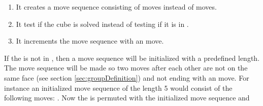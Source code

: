 \begin{enumerate}
	\item It creates a move sequence consisting of  moves instead of  moves.
	\item It test if the cube is solved instead of testing if it is in .
	\item It increments the move sequence with an  move.
\end{enumerate} 

If the \rubik{} is not in , then a move sequence will be initialized with a predefined length.
The move sequence will be made so two moves after each other are not on the same face (see section \ref{sec:groupDefinition}) and not ending with an  move.
For instance an initialized move sequence of the length 5 would consist of the following moves: .
Now the \rubik{} is permuted with the initialized move sequence and 

